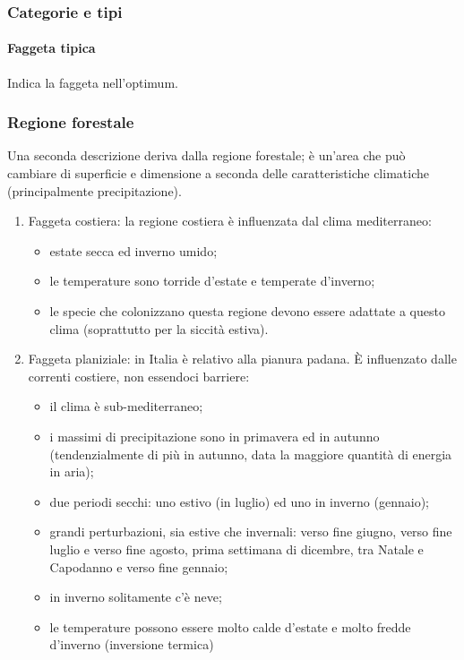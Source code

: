 \subsubsection{Categorie e tipi}
\paragraph{Faggeta tipica} Indica la faggeta nell'optimum.
\subsubsection{Regione forestale}
Una seconda descrizione deriva dalla regione forestale; è un'area che può cambiare di superficie e dimensione a seconda delle caratteristiche climatiche (principalmente precipitazione).
\begin{enumerate}[nosep]
    \item Faggeta costiera: la regione costiera è influenzata dal clima mediterraneo:
    \begin{itemize}[nosep]
        \item estate secca ed inverno umido;
        \item le temperature sono torride d'estate e temperate d'inverno;
        \item le specie che colonizzano questa regione devono essere adattate a questo clima (soprattutto per la siccità estiva).
    \end{itemize}
    \item Faggeta planiziale: in Italia è relativo alla pianura padana. È influenzato dalle correnti costiere, non essendoci barriere:
    \begin{itemize}[nosep]
        \item il clima è sub-mediterraneo;
        \item i massimi di precipitazione sono in primavera ed in autunno (tendenzialmente di più in autunno, data la maggiore quantità di energia in aria);
        \item due periodi secchi: uno estivo (in luglio) ed uno in inverno (gennaio);
        \item grandi perturbazioni, sia estive che invernali: verso fine giugno, verso fine luglio e verso fine agosto, prima settimana di dicembre, tra Natale e Capodanno e verso fine gennaio;
        \item in inverno solitamente c'è neve;
        \item le temperature possono essere molto calde d'estate e molto fredde d'inverno (inversione termica)
    \end{itemize}

\end{enumerate}
